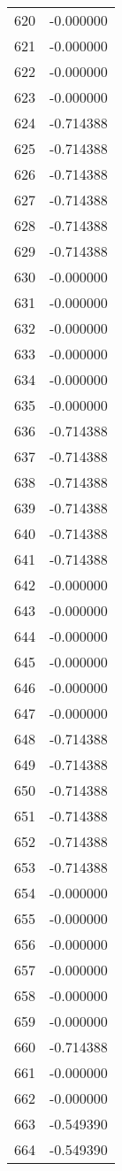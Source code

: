 \documentclass[12pt]{article}
\begin{document}
\begin{longtable}{@{}cc@{}}
620 & -0.000000 \\
621 & -0.000000 \\
622 & -0.000000 \\
623 & -0.000000 \\
624 & -0.714388 \\
625 & -0.714388 \\
626 & -0.714388 \\
627 & -0.714388 \\
628 & -0.714388 \\
629 & -0.714388 \\
630 & -0.000000 \\
631 & -0.000000 \\
632 & -0.000000 \\
633 & -0.000000 \\
634 & -0.000000 \\
635 & -0.000000 \\
636 & -0.714388 \\
637 & -0.714388 \\
638 & -0.714388 \\
639 & -0.714388 \\
640 & -0.714388 \\
641 & -0.714388 \\
642 & -0.000000 \\
643 & -0.000000 \\
644 & -0.000000 \\
645 & -0.000000 \\
646 & -0.000000 \\
647 & -0.000000 \\
648 & -0.714388 \\
649 & -0.714388 \\
650 & -0.714388 \\
651 & -0.714388 \\
652 & -0.714388 \\
653 & -0.714388 \\
654 & -0.000000 \\
655 & -0.000000 \\
656 & -0.000000 \\
657 & -0.000000 \\
658 & -0.000000 \\
659 & -0.000000 \\
660 & -0.714388 \\
661 & -0.000000 \\
662 & -0.000000 \\
663 & -0.549390 \\
664 & -0.549390 \\

\end{longtable}
\end{document}

